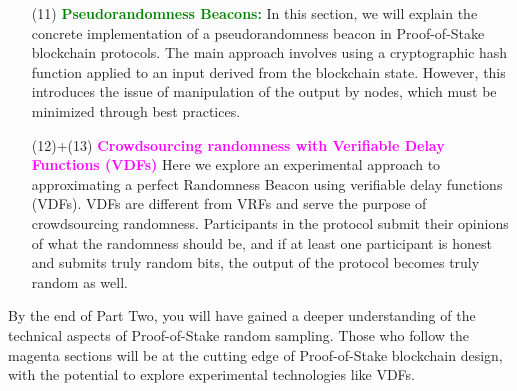 \begin{enumerate}[label=(\arabic*)]
  \item[(11)] \textcolor{green}{\textbf{Pseudorandomness Beacons:}} In this section, we will explain the concrete implementation of a pseudorandomness beacon in Proof-of-Stake blockchain protocols. The main approach involves using a cryptographic hash function applied to an input derived from the blockchain state. However, this introduces the issue of manipulation of the output by nodes, which must be minimized through best practices.

  \item[(12)+(13)] \textcolor{magenta}{\textbf{Crowdsourcing randomness with Verifiable Delay Functions (VDFs)}} Here we explore an experimental approach to approximating a perfect Randomness Beacon using verifiable delay functions (VDFs). VDFs are different from VRFs and serve the purpose of crowdsourcing randomness. Participants in the protocol submit their opinions of what the randomness should be, and if at least one participant is honest and submits truly random bits, the output of the protocol becomes truly random as well.
\end{enumerate}
By the end of Part Two, you will have gained a deeper understanding of the technical aspects of Proof-of-Stake random sampling. Those who follow the magenta sections will be at the cutting edge of Proof-of-Stake blockchain design, with the potential to explore experimental technologies like VDFs.

